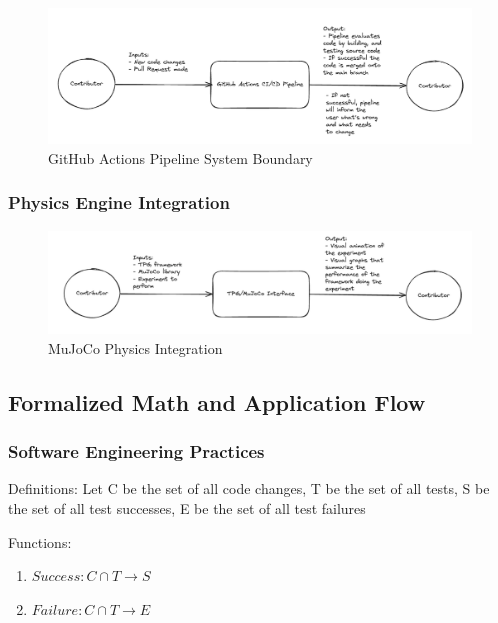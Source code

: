 \documentclass[12pt]{article}
\begin{document}
\begin{figure}[ht!]
  \begin{center}
   \includegraphics[scale=0.5]{GitHubActionsSystem.png}
  \caption{GitHub Actions Pipeline System Boundary}
  \label{Fig_GitHubActions} 
  \end{center}
\end{figure}

\subsubsection{Physics Engine Integration}

\begin{figure}[ht!]
  \begin{center}
   \includegraphics[scale=0.5]{PhysicsIntegration.png}
  \caption{MuJoCo Physics Integration}
  \label{Fig_MuJoCo} 
  \end{center}
\end{figure}

\subsection{Formalized Math and Application Flow}
\subsubsection{Software Engineering Practices}

Definitions: Let C be the set of all code changes, T be the set of all tests, S be the set of all test successes, E be the set of all test failures

Functions:
\begin{enumerate}
  \item \begin{math}
    Success: C \cap T \rightarrow S
  \end{math}
  \item \begin{math}
    Failure: C \cap T \rightarrow E
  \end{math}
\end{enumerate}
\end{document}
